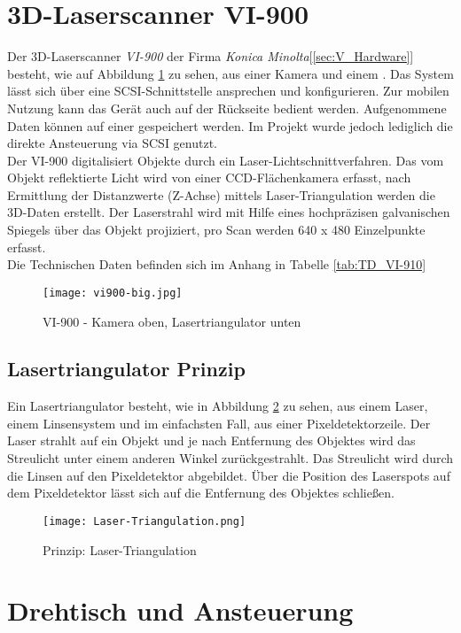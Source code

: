 \section{3D-Laserscanner VI-900}
\label{sec:VI-900}
Der 3D-Laserscanner \emph{VI-900} der Firma \emph{Konica Minolta}[\ref{sec:V_Hardware}] besteht, wie auf Abbildung \ref{fig:VI900} zu sehen, aus einer Kamera und einem . Das System lässt sich über eine SCSI-Schnittstelle ansprechen und konfigurieren. Zur mobilen Nutzung kann das Gerät auch auf der Rückseite bedient werden. Aufgenommene Daten können auf einer  gespeichert werden. Im Projekt wurde jedoch lediglich die direkte Ansteuerung via SCSI genutzt.\\
Der VI-900 digitalisiert Objekte durch ein Laser-Lichtschnittverfahren. Das vom Objekt reflektierte Licht wird von einer CCD-Flächenkamera erfasst, nach Ermittlung der Distanzwerte (Z-Achse) mittels Laser-Triangulation werden die 3D-Daten erstellt. Der Laserstrahl wird mit Hilfe eines hochpräzisen galvanischen Spiegels über das Objekt projiziert, pro Scan werden 640 x 480 Einzelpunkte erfasst.\cite{Minolta:Einleitung}\\
Die Technischen Daten befinden sich im Anhang in Tabelle \ref{tab:TD_VI-910}
\begin{figure}[htb]
\centering
\texttt{[image: vi900-big.jpg]}
\caption{VI-900 - Kamera oben, Lasertriangulator unten}
\label{fig:VI900}
\end{figure}
\subsection{Lasertriangulator Prinzip}
\label{sec:LaserTri}
Ein Lasertriangulator besteht, wie in Abbildung \ref{fig:LaserTriangulator} zu sehen, aus einem Laser, einem Linsensystem und im einfachsten Fall, aus einer Pixeldetektorzeile. Der Laser strahlt auf ein Objekt und je nach Entfernung des Objektes wird das Streulicht unter einem anderen Winkel zurückgestrahlt. Das Streulicht wird durch die Linsen auf den Pixeldetektor abgebildet. Über die Position des Laserspots auf dem Pixeldetektor lässt sich auf die Entfernung des Objektes schließen.
\begin{figure}[h]
\centering
\texttt{[image: Laser-Triangulation.png]}
\caption{Prinzip: Laser-Triangulation}
\label{fig:LaserTriangulator}
\end{figure}

\section{Drehtisch und Ansteuerung}
\label{sec:AnsteuerungDrehtisch}
